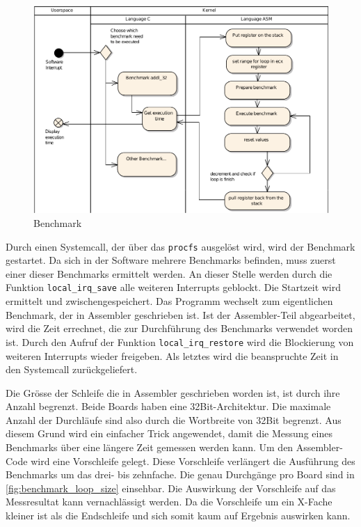 \begin{figure}[H]
\centering
\includegraphics[width=1.0\textwidth]{images/benchmark_ea.pdf}
\caption{Benchmark}
\label{fig:Benchmark}
\end{figure}


Durch einen Systemcall, der über das \texttt{procfs} ausgelöst wird, wird der Benchmark gestartet. Da sich in der Software mehrere Benchmarks befinden, muss zuerst einer dieser Benchmarks ermittelt werden. An dieser Stelle werden durch die Funktion \texttt{local\_irq\_save} alle weiteren Interrupts geblockt. Die Startzeit wird ermittelt und zwischengespeichert. Das Programm wechselt zum eigentlichen Benchmark, der in Assembler geschrieben ist. Ist der Assembler-Teil abgearbeitet, wird die Zeit errechnet, die zur Durchführung des Benchmarks verwendet worden ist. Durch den Aufruf der Funktion \texttt{local\_irq\_restore} wird die Blockierung von weiteren Interrupts wieder freigeben. Als letztes wird die beanspruchte Zeit in den Systemcall zurückgeliefert.
\par
Die Grösse der Schleife die in Assembler geschrieben worden ist, ist durch ihre Anzahl begrenzt. Beide Boards haben eine 32Bit-Architektur. Die maximale Anzahl der Durchläufe sind also durch die Wortbreite von 32Bit begrenzt. Aus diesem Grund wird ein einfacher Trick angewendet, damit die Messung eines Benchmarks über eine längere Zeit gemessen werden kann. Um den Assembler-Code wird eine Vorschleife gelegt. Diese Vorschleife verlängert die Ausführung des Benchmarks um das drei- bis zehnfache. Die genau Durchgänge pro Board sind in \autoref{fig:benchmark_loop_size} einsehbar. Die Auswirkung der Vorschleife auf das Messresultat kann vernachlässigt werden. Da die Vorschleife um ein X-Fache kleiner ist als die Endschleife und sich somit kaum auf Ergebnis auswirken kann.

